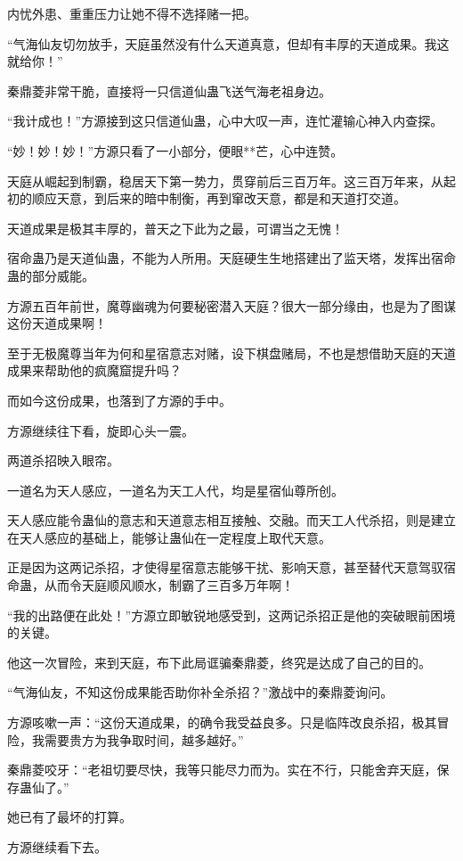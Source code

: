 \begin{this_body}
内忧外患、重重压力让她不得不选择赌一把。

“气海仙友切勿放手，天庭虽然没有什么天道真意，但却有丰厚的天道成果。我这就给你！”

秦鼎菱非常干脆，直接将一只信道仙蛊飞送气海老祖身边。

“我计成也！”方源接到这只信道仙蛊，心中大叹一声，连忙灌输心神入内查探。

“妙！妙！妙！”方源只看了一小部分，便眼**芒，心中连赞。

天庭从崛起到制霸，稳居天下第一势力，贯穿前后三百万年。这三百万年来，从起初的顺应天意，到后来的暗中制衡，再到窜改天意，都是和天道打交道。

天道成果是极其丰厚的，普天之下此为之最，可谓当之无愧！

宿命蛊乃是天道仙蛊，不能为人所用。天庭硬生生地搭建出了监天塔，发挥出宿命蛊的部分威能。

方源五百年前世，魔尊幽魂为何要秘密潜入天庭？很大一部分缘由，也是为了图谋这份天道成果啊！

至于无极魔尊当年为何和星宿意志对赌，设下棋盘赌局，不也是想借助天庭的天道成果来帮助他的疯魔窟提升吗？

而如今这份成果，也落到了方源的手中。

方源继续往下看，旋即心头一震。

两道杀招映入眼帘。

一道名为天人感应，一道名为天工人代，均是星宿仙尊所创。

天人感应能令蛊仙的意志和天道意志相互接触、交融。而天工人代杀招，则是建立在天人感应的基础上，能够让蛊仙在一定程度上取代天意。

正是因为这两记杀招，才使得星宿意志能够干扰、影响天意，甚至替代天意驾驭宿命蛊，从而令天庭顺风顺水，制霸了三百多万年啊！

“我的出路便在此处！”方源立即敏锐地感受到，这两记杀招正是他的突破眼前困境的关键。

他这一次冒险，来到天庭，布下此局诓骗秦鼎菱，终究是达成了自己的目的。

“气海仙友，不知这份成果能否助你补全杀招？”激战中的秦鼎菱询问。

方源咳嗽一声：“这份天道成果，的确令我受益良多。只是临阵改良杀招，极其冒险，我需要贵方为我争取时间，越多越好。”

秦鼎菱咬牙：“老祖切要尽快，我等只能尽力而为。实在不行，只能舍弃天庭，保存蛊仙了。”

她已有了最坏的打算。

方源继续看下去。


\end{this_body}

